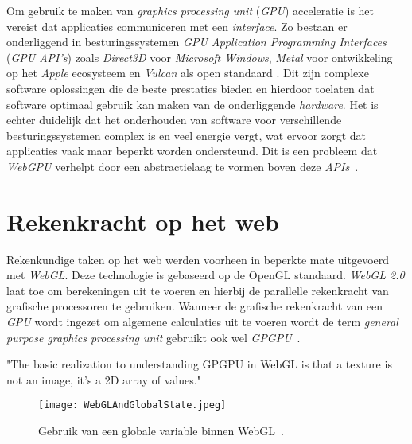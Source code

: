 Om gebruik te maken van \textit{graphics processing unit} (\textit{GPU}) acceleratie is het vereist dat applicaties communiceren met een \textit{interface}. Zo bestaan er onderliggend in besturingssystemen \textit{GPU Application Programming Interfaces} (\textit{GPU API's}) zoals \textit{Direct3D} voor \textit{Microsoft Windows}, \textit{Metal} voor ontwikkeling op het \textit{Apple} ecosysteem en \textit{Vulcan} als open standaard \autocite{Nguyen2022}. Dit zijn complexe software oplossingen die de beste prestaties bieden en hierdoor toelaten dat software optimaal gebruik kan maken van de onderliggende \textit{hardware}. Het is echter duidelijk dat het onderhouden van software voor verschillende besturingssystemen complex is en veel energie vergt, wat ervoor zorgt dat applicaties vaak maar beperkt worden ondersteund. Dit is een probleem dat \textit{WebGPU} verhelpt door een abstractielaag te vormen boven deze \textit{APIs}~\autocite{Wallez2023}.

\section{Rekenkracht op het web}
\label{sec:PowerOnWeb}

Rekenkundige taken op het web werden voorheen in beperkte mate uitgevoerd met \textit{WebGL}. Deze technologie is gebaseerd op de OpenGL standaard. \textit{WebGL 2.0} laat toe om berekeningen uit te voeren en hierbij de parallelle rekenkracht van grafische processoren te gebruiken. Wanneer de grafische rekenkracht van een \textit{GPU} wordt ingezet om algemene calculaties uit te voeren wordt de term \textit{general purpose graphics processing unit} gebruikt ook wel \textit{GPGPU}~\autocite{Skrbina2012}.

\begin{displayquote}
    "The basic realization to understanding GPGPU in WebGL is that a texture is not an image, it's a 2D array of values."
\end{displayquote}

\begin{figure}
    \texttt{[image: WebGLAndGlobalState.jpeg]}
    \caption[De \textit{Global State} in \textit{WebGL}~\autocite{GFXFundamentals2024}]{Gebruik van een globale variable binnen WebGL~\autocite{GFXFundamentals2024}.}
    \label{fig:WebGL Global State}
\end{figure}

